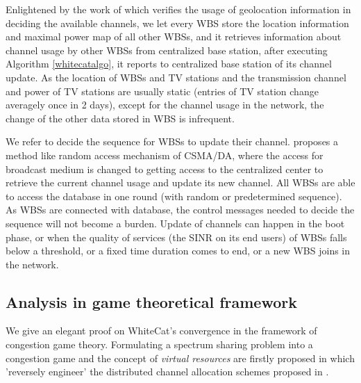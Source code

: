Enlightened by the work of \cite{SenseLess2011} which verifies the usage of geolocation information in deciding the available channels, we let every WBS store the location information and maximal power map of all other WBSs, and it retrieves information about channel usage by other WBSs from centralized base station, after executing Algorithm \ref{whitecatalgo}, it reports to centralized base station of its channel update. As the location of WBSs and TV stations and the transmission channel and power of TV stations are usually static (entries of TV station change averagely once in 2 days\cite{SenseLess2011}), except for the channel usage in the network, the change of the other data stored in WBS is infrequent. 


We refer \cite{CApotentialLearning_05dyspan} to decide the sequence for WBSs to update their channel. \cite{CApotentialLearning_05dyspan} proposes a method like random access mechanism of CSMA/DA, where the access for broadcast medium is changed to getting access to the centralized center to retrieve the current channel usage and update its new channel. All WBSs are able to access the database in one round (with random or predetermined sequence). As WBSs are connected with database, the control messages needed to decide the sequence will not become a burden. Update of channels can happen in the boot phase, or when the quality of services (the SINR on its end users) of WBSs falls below a threshold, or a fixed time duration comes to end, or a new WBS joins in the network. 


\subsection{Analysis in game theoretical framework}
\label{game}
We give an elegant proof on WhiteCat's convergence in the framework of congestion game theory. Formulating a spectrum sharing problem into a congestion game and the concept of \textit{virtual resources} are firstly proposed in \cite{allerton08_liu} which 'reversely engineer' the distributed channel allocation schemes proposed in \cite{babadi_08, Ko_DistributedCA}.

